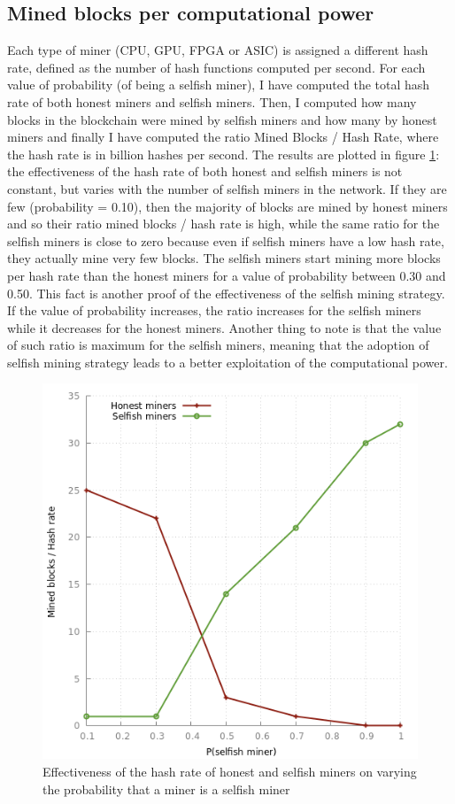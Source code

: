 \documentclass{article}
\begin{document}
\subsection{Mined blocks per computational power}
Each type of miner (CPU, GPU, FPGA or ASIC) is assigned a different hash rate, defined as the number of hash functions computed per second. For each value of probability (of being a selfish miner), I have computed the total hash rate of both honest miners and selfish miners. Then, I computed how many blocks in the blockchain were mined by selfish miners and how many by honest miners and finally I have computed the ratio Mined Blocks / Hash Rate, where the hash rate is in billion hashes per second. The results are plotted in figure \ref{fig:bphr}: the effectiveness of the hash rate of both honest and selfish miners is not constant, but varies with the number of selfish miners in the network. If they are few (probability = 0.10), then the majority of blocks are mined by honest miners and so their ratio mined blocks / hash rate is high, while the same ratio for the selfish miners is close to zero because even if selfish miners have a low hash rate, they actually mine very few blocks. The selfish miners start mining more blocks per hash rate than the honest miners for a value of probability between 0.30 and 0.50. This fact is another proof of the effectiveness of the selfish mining strategy. If the value of probability increases, the ratio increases for the selfish miners while it decreases for the honest miners. Another thing to note is that the value of such ratio is maximum for the selfish miners, meaning that the adoption of selfish mining strategy leads to a better exploitation of the computational power.

\begin{figure}
\centerline{\includegraphics[scale=0.50]{plots/blocks_per_hashrate}}
\caption{Effectiveness of the hash rate of honest and selfish miners on varying the probability that a miner is a selfish miner}
\label{fig:bphr}
\end{figure}
\end{document}
